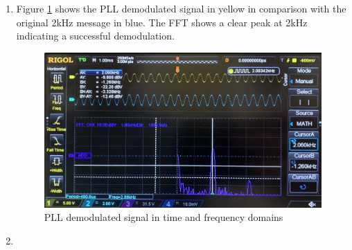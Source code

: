 \documentclass[11pt]{article}
\begin{document}
\begin{enumerate}[label=(\alph*)]
\item %
Figure \ref{fig:W3Q6b} shows the PLL demodulated signal in yellow in comparison with the original 2kHz message in blue. The FFT shows a clear peak at 2kHz indicating a successful demodulation. %



\begin{figure}[H]
    \centering
    \includegraphics[width=15cm]{W3Q6b.jpeg}
    \caption{PLL demodulated signal in time and frequency domains}
    \label{fig:W3Q6b}
\end{figure}

\item %




\end{enumerate}
\end{document}
